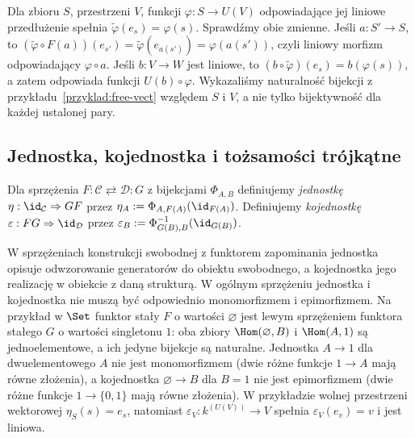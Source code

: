 \begin{przyklad}
Dla zbioru $S$, przestrzeni $V$, funkcji $\varphi:S\to U(V)$ odpowiadające jej liniowe przedłużenie spełnia $\widetilde\varphi(e_s)=\varphi(s)$. Sprawdźmy obie zmienne. Jeśli $a:S'\to S$, to $(\widetilde\varphi\circ F(a))(e_{s'})=\widetilde\varphi(e_{a(s')})=\varphi(a(s'))$, czyli liniowy morfizm odpowiadający $\varphi\circ a$. Jeśli $b:V\to W$ jest liniowe, to $(b\circ\widetilde\varphi)(e_s)=b(\varphi(s))$, a zatem odpowiada funkcji $U(b)\circ\varphi$. Wykazaliśmy naturalność bijekcji z przykładu~\ref{przyklad:free-vect} względem $S$ i $V$, a nie tylko bijektywność dla każdej ustalonej pary.
\end{przyklad}


\subsection{Jednostka, kojednostka i tożsamości trójkątne}

\begin{definicja}\label{def:unit-counit}
Dla sprzężenia $F:\mathcal C\rightleftarrows\mathcal D:G$ z bijekcjami $\Phi_{A,B}$ definiujemy \emph{jednostkę} $\eta:\id_{\mathcal C}\Rightarrow GF$ przez $\eta_A:=\Phi_{A,F(A)}(\id_{F(A)})$. Definiujemy \emph{kojednostkę} $\varepsilon:FG\Rightarrow\id_{\mathcal D}$ przez $\varepsilon_B:=\Phi_{G(B),B}^{-1}(\id_{G(B)})$.
\end{definicja}

W sprzężeniach konstrukcji swobodnej z funktorem zapominania jednostka opisuje odwzorowanie generatorów do obiektu swobodnego, a kojednostka jego realizację w obiekcie z daną strukturą. W ogólnym sprzężeniu jednostka i kojednostka nie muszą być odpowiednio monomorfizmem i epimorfizmem. Na przykład w $\Set$ funktor stały $F$ o wartości $\varnothing$ jest lewym sprzężeniem funktora stałego $G$ o wartości singletonu $1$: oba zbiory $\Hom(\varnothing,B)$ i $\Hom(A,1)$ są jednoelementowe, a ich jedyne bijekcje są naturalne. Jednostka $A\to1$ dla dwuelementowego $A$ nie jest monomorfizmem (dwie różne funkcje $1\to A$ mają równe złożenia), a kojednostka $\varnothing\to B$ dla $B=1$ nie jest epimorfizmem (dwie różne funkcje $1\to\{0,1\}$ mają równe złożenia). W przykładzie wolnej przestrzeni wektorowej $\eta_S(s)=e_s$, natomiast
$\varepsilon_V:k^{(U(V))}\to V$ spełnia $\varepsilon_V(e_v)=v$ i jest liniowa.

